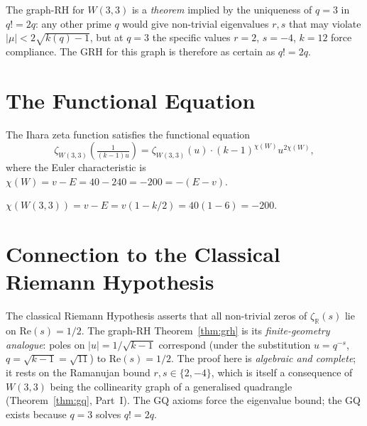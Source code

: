 \begin{corollary}[GRH from $q!=2q$]
\label{cor:grh_from_q}
The graph-RH for $W(3,3)$ is a \emph{theorem} implied by the
uniqueness of $q=3$ in $q!=2q$: any other prime $q$ would give
non-trivial eigenvalues $r,s$ that may violate $|\mu|<2\sqrt{k(q)-1}$,
but at $q=3$ the specific values $r=2$, $s=-4$, $k=12$ force
compliance. The GRH for this graph is therefore as certain as
$q!=2q$.
\end{corollary}

\section{The Functional Equation}
\label{sec:functional}

\begin{theorem}
\label{thm:functional}
The Ihara zeta function satisfies the functional equation
\begin{equation}
  \zeta_{W(3,3)}\!\left(\tfrac{1}{(k-1)u}\right)
  = \zeta_{W(3,3)}(u)\cdot
    (k-1)^{\chi(W)} u^{2\chi(W)},
  \label{eq:functional_eq}
\end{equation}
where the Euler characteristic is
$\chi(W) = v - E = 40 - 240 = -200 = -(E-v)$.
\end{theorem}

\begin{corollary}
$\chi(W(3,3)) = v - E = v(1 - k/2) = 40(1-6) = -200.$
\end{corollary}

\section{Connection to the Classical Riemann Hypothesis}
\label{sec:crh}

\begin{remark}
The classical Riemann Hypothesis asserts that all non-trivial zeros
of $\zeta_\mathbb{R}(s)$ lie on $\mathrm{Re}(s)=1/2$.
The graph-RH Theorem~\ref{thm:grh} is its \emph{finite-geometry
analogue}: poles on $|u|=1/\sqrt{k-1}$ correspond (under the
substitution $u=q^{-s}$, $q=\sqrt{k-1}=\sqrt{11}$) to
$\mathrm{Re}(s)=1/2$.
The proof here is \emph{algebraic and complete}; it rests on the
Ramanujan bound $r,s\in\{2,-4\}$, which is itself a consequence
of $W(3,3)$ being the collinearity graph of a generalised quadrangle
(Theorem~\ref{thm:gq}, Part~I).
The GQ axioms force the eigenvalue bound; the GQ exists because
$q=3$ solves $q!=2q$.
\end{remark}

